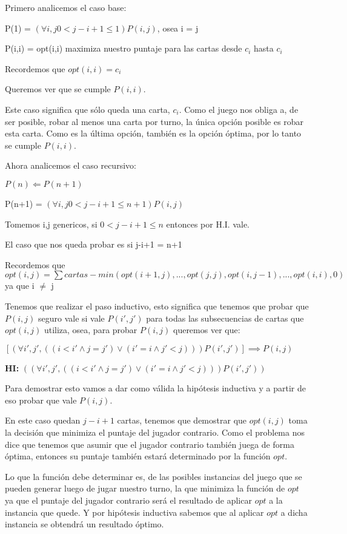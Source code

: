 Primero analicemos el caso base:

P(1) = $(\forall i,j 0 < j -i + 1 \leq 1) P(i,j)$, osea i = j

P(i,i) = opt(i,i) maximiza nuestro puntaje para las cartas desde $c_i$ hasta $c_i$

Recordemos que $opt(i,i) = c_i$

Queremos ver que se cumple $P(i,i)$.

Este caso significa que sólo queda una carta, $c_i$. Como el juego nos obliga a, de ser posible, robar al menos una carta por turno, la única opción posible es robar esta carta. Como es la última opción, también es la opción óptima, por lo tanto se cumple $P(i,i)$.

Ahora analicemos el caso recursivo:

$ P(n) \Leftarrow P(n+1)$

P(n+1) = $(\forall i,j 0 < j -i + 1 \leq n+1) P(i,j)$

Tomemos i,j genericos, si $0 < j-i+1 \leq n$ entonces por H.I. vale.

El caso que nos queda probar es si j-i+1 = n+1

Recordemos que $opt(i,j) = \sum cartas - min(opt(i+1, j), ..., opt(j,j), opt(i, j-1), ... ,opt(i,i), 0)$ ya que i $\neq$ j

Tenemos que realizar el paso inductivo, esto significa que tenemos que probar que $P(i,j)$ seguro vale si vale $P(i',j')$ para todas las subsecuencias de cartas que $opt(i,j)$ utiliza, osea, para probar $P(i,j)$ queremos ver que:

$[(\forall i',j',(( i < i' \wedge j = j') \vee (i' = i \wedge j' < j))) P(i',j')]  \implies P(i,j)$

\textbf{HI:} $((\forall i',j',(( i < i' \wedge j = j') \vee (i' = i \wedge j' < j))) P(i',j'))$

Para demostrar esto vamos a dar como válida la hipótesis inductiva y a partir de eso probar que vale $P(i,j)$.

En este caso quedan $j-i+1$ cartas, tenemos que demostrar que $opt(i,j)$ toma la decisión que minimiza el puntaje del jugador contrario. Como el problema nos dice que tenemos que asumir que el jugador contrario también juega de forma óptima, entonces su puntaje también estará determinado por la función $opt$.

Lo que la función debe determinar es, de las posibles instancias del juego que se pueden generar luego de jugar nuestro turno, la que minimiza la función de $opt$ ya que el puntaje del jugador contrario será el resultado de aplicar $opt$ a la instancia que quede. Y por hipótesis inductiva sabemos que al aplicar $opt$ a dicha instancia se obtendrá un resultado óptimo.

